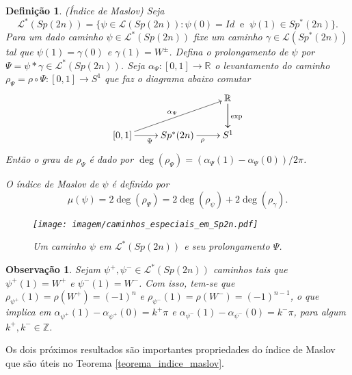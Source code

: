 \documentclass[12pt]{book}
\newtheorem{definicao}[teorema]{Definição}
\newtheorem{observacao}[teorema]{Observação}
\newcommand{\caminhosespeciais}[1]{\mathcal{L}^{*}(#1)}
\newcommand{\caminhos}{\mathcal{L}}
\newcommand{\circulo}{S^{1}}
\newcommand{\dominioMaslov}{\caminhos^{*}(\gruposimpletico{2n})}
\newcommand{\gruposimpletico}[1]{Sp(#1)}
\newcommand{\gruposimpleticonaodegenerado}[1]{Sp^{#1}(2n)}
\newcommand{\inteiros}{\mathbb{Z}}
\newcommand{\intervalo}{[0,1]}
\newcommand{\real}[1]{\mathbb{R}^{#1}}
\newcommand{\reta}{\real{}}
\begin{document}
	\begin{definicao}
		(Índice de Maslov) 
		Seja 
		$$
		\dominioMaslov=\{ \psi \in \caminhos(\gruposimpletico{2n}): \psi(0)=Id \;\; \text{e}\;\; \psi(1)\in \gruposimpleticonaodegenerado{*}\}.
		$$
		Para um dado caminho $\psi \in \dominioMaslov$ fixe um caminho $\gamma \in \caminhos(\gruposimpleticonaodegenerado{*})$ tal que $\psi(1)=\gamma(0)$ e $\gamma(1)=W^{\pm}$. Defina o prolongamento de $\psi$ por $\Psi = \psi*\gamma \in   \dominioMaslov$. Seja $\alpha_{\Psi}: \intervalo \to \reta$ o levantamento do caminho $\rho_{\Psi} = \rho \circ \Psi:\intervalo\to \circulo$ que faz o diagrama abaixo comutar
		$$
		\xymatrix{
			& & \real{}\ar[d]\ar[d]^{\text{exp}}
			\\
			[0,1 ]\ar[urr]^{\alpha_{\Psi}} \ar[r]_{\Psi} & \gruposimpleticonaodegenerado{*} \ar[r]_{\rho} & S^{1}
		}
		$$	
		Então o grau de $\rho_{\Psi}$ é dado por $\deg(\rho_{\Psi}) = (\alpha_{\Psi}(1)-\alpha_{\Psi}(0))/2\pi$. 
		
		O índice de Maslov de $\psi$ é definido por
		$$
		\mu(\psi)= 2\deg(\rho_{\Psi}) = 2\deg(\rho_{\psi}) + 2\deg(\rho_{\gamma}).
		$$
		\begin{figure}[!h]
			\centering
			\texttt{[image: imagem/caminhos\_especiais\_em\_Sp2n.pdf]}
			\caption{Um caminho $\psi$ em $\caminhosespeciais{\gruposimpletico{2n}}$ e seu prolongamento $\Psi$.}
		\end{figure}
	\end{definicao}
	
	\begin{observacao}
		Sejam $\psi^{+}, \psi^{-} \in  \caminhosespeciais{\gruposimpletico{2n}}$ caminhos tais que $\psi^{+}(1)=W^{+}$ e $\psi^{-}(1)=W^{-}$. Com isso, tem-se que $\rho_{\psi^{+}}(1) =\rho(W^{+}) = (-1)^{n}$ e $\rho_{\psi^{-}}(1) =\rho(W^{-}) = (-1)^{n-1}$, o que implica em $\alpha_{\psi^{+}}(1)-\alpha_{\psi^{+}}(0) = k^{+}\pi$ e $\alpha_{\psi^{-}}(1)-\alpha_{\psi^{-}}(0) = k^{-}\pi$, para algum $k^{+}, k^{-}\in \inteiros$.
	\end{observacao}
	
	Os dois próximos resultados são importantes propriedades do índice de Maslov que são úteis no Teorema \ref{teorema_indice_maslov}.
\end{document}
